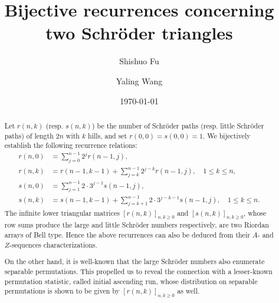 \documentclass[11pt,reqno]{amsart}
\numberwithin{equation}{section}
\theoremstyle{plain}
\theoremstyle{definition}
\begin{document}
\title[Bijective Schr\"oder recurrences]{Bijective recurrences concerning two Schr\"oder triangles}

\author[S. Fu]{Shishuo Fu}
\address[Shishuo Fu]{College of Mathematics and Statistics, Chongqing University, Huxi campus, Chongqing 401331, P.R. China}


\author[Y. Wang]{Yaling Wang}

\address[Yaling Wang]{College of Mathematics and Statistics, Chongqing University, Huxi campus, Chongqing 401331, P.R. China}

\date{\today}


\begin{abstract}
Let $r(n,k)$ (resp. $s(n,k)$) be the number of Schr\"oder paths (resp. little Schr\"oder paths) of length $2n$ with $k$ hills, and set $r(0,0)=s(0,0)=1$. We bijectively establish the following recurrence relations:
\begin{align*}
r(n,0)&=\sum\limits_{j=0}^{n-1}2^{j}r(n-1,j),\\
r(n,k)&=r(n-1,k-1)+\sum\limits_{j=k}^{n-1}2^{j-k}r(n-1,j),\quad 1\le k\le n,\\
s(n,0) &=\sum\limits_{j=1}^{n-1}2\cdot3^{j-1}s(n-1,j),\\
s(n,k) &=s(n-1,k-1)+\sum\limits_{j=k+1}^{n-1}2\cdot3^{j-k-1}s(n-1,j),\quad 1\le k\le n.
\end{align*}
The infinite lower triangular matrices $[r(n,k)]_{n,k\ge 0}$ and $[s(n,k)]_{n,k\ge 0}$, whose row sums produce the large and little Schr\"oder numbers respectively, are two Riordan arrays of Bell type. Hence the above recurrences can also be deduced from their $A$- and $Z$-sequences characterizations.

On the other hand, it is well-known that the large Schr\"oder numbers also enumerate separable permutations. This propelled us to reveal the connection with a lesser-known permutation statistic, called initial ascending run, whose distribution on separable permutations is shown to be given by $[r(n,k)]_{n,k\ge 0}$ as well.
\end{abstract}

\subjclass[2010]{}

\keywords{}

\maketitle

\end{document}
